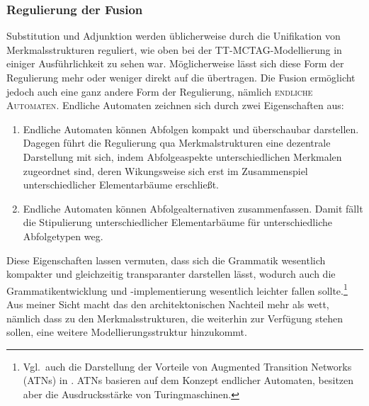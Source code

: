 \subsubsection*{Regulierung der Fusion}

Substitution und Adjunktion werden üblicherweise durch die Unifikation von Merkmalsstrukturen reguliert, wie oben bei der TT-MCTAG-Modellierung in einiger Ausführlichkeit zu sehen war. Möglicherweise lässt sich diese Form der Regulierung mehr oder weniger direkt auf die  übertragen. Die Fusion ermöglicht jedoch auch eine ganz andere Form der Regulierung, nämlich \textsc{endliche Automaten}. Endliche Automaten zeichnen sich durch zwei Eigenschaften aus:

\begin{enumerate}
  \item Endliche Automaten können Abfolgen kompakt und überschaubar darstellen. Dagegen führt die Regulierung qua Merkmalstrukturen eine dezentrale Darstellung mit sich, indem Abfolgeaspekte unterschiedlichen Merkmalen zugeordnet sind, deren Wikungsweise sich erst im Zusammenspiel unterschiedlicher Elementarbäume erschlie\ss t.
\item Endliche Automaten können Abfolgealternativen zusammenfassen. Damit fällt die Stipulierung unterschiedlicher Elementarbäume für unterschiedliche Abfolgetypen weg. 
\end{enumerate}

Diese Eigenschaften lassen vermuten, dass sich die Grammatik wesentlich kompakter und gleichzeitig transparanter darstellen lässt, wodurch auch die Grammatikentwicklung und -implementierung wesentlich leichter fallen sollte.\footnote{Vgl.\ auch die Darstellung der Vorteile von Augmented Transition Networks (ATNs) in \citet[599ff]{Woods:70}. ATNs basieren auf dem Konzept endlicher Automaten, besitzen aber die Ausdrucksstärke von Turingmaschinen.} 
Aus meiner Sicht macht das den architektonischen Nachteil mehr als wett, nämlich dass zu den Merkmalsstrukturen, die weiterhin zur Verfügung stehen sollen, eine weitere Modellierungsstruktur hinzukommt. 

